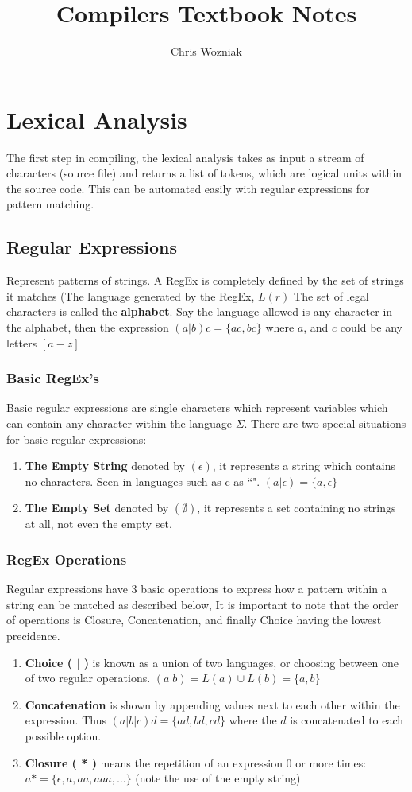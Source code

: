 \documentclass{report}
\title{Compilers Textbook Notes}
\author{Chris Wozniak}
\theoremstyle{definition}
\begin{document}
\maketitle
\tableofcontents
\chapter{Lexical Analysis}
	The first step in compiling, the lexical analysis takes as input a stream of characters (source file) and returns a list of tokens, which are 
	logical units within the source code. This can be automated easily with regular expressions for pattern matching.
	
	\section{Regular Expressions}	
		Represent patterns of strings. A RegEx is completely defined by the set of strings it matches (The language
		generated by the RegEx, $L(r)$ The set of legal characters is called the \textbf{alphabet}. Say the language
		allowed is any character in the alphabet, then the expression $(a|b)c = \{ac, bc\}$ where $a$, and $c$ could be
		any letters $[a-z]$
		\subsection{Basic RegEx's}
			Basic regular expressions are single characters which represent variables which can contain any 
			character within the language $\Sigma$. There are two special situations for basic regular expressions:
			\begin{enumerate}
				\item \textbf{The Empty String} denoted by $(\epsilon)$, it represents a string which contains no characters.
					Seen in languages such as c as ``". $(a|\epsilon) = \{a, \epsilon\}$
				\item \textbf{The Empty Set} denoted by $(\emptyset)$, it represents a set containing no strings at all, not
					even the empty set.
			\end{enumerate}
\newpage
		\subsection{RegEx Operations}
			Regular expressions have 3 basic operations to express how a pattern within a string can be matched as 
			described below, It is important to note that the order of operations is Closure, Concatenation, and finally
			Choice having the lowest precidence.
			\begin{enumerate}
				\item \textbf{Choice ( $|$ )} is known as a union of two languages, or choosing between one of two
					regular operations. $(a|b) = L(a) \cup L(b) = \{a, b\}$
				\item \textbf{Concatenation} is shown by appending values next to each other within the expression.
					Thus $(a|b|c)d = \{ad, bd, cd\}$ where the $d$ is concatenated to each possible option.
				\item \textbf{Closure ( * )} means the repetition of an expression $0$ or more times:
					$a* = \{\epsilon, a, aa, aaa, \ldots\}$ (note the use of the empty string)
			\end{enumerate}
\end{document}
